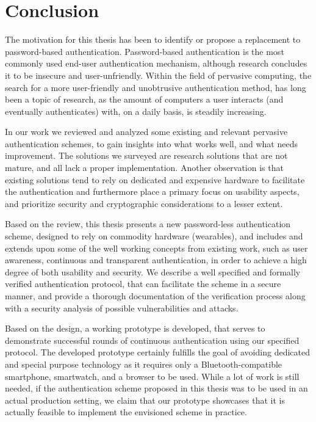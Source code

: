 \chapter{Conclusion}\label{ch:conclusion}

The motivation for this thesis has been to identify or propose a replacement to password-based authentication. Password-based authentication is the most commonly used end-user authentication mechanism, although research concludes it to be insecure and user-unfriendly.
Within the field of pervasive computing, the search for a more user-friendly and unobtrusive authentication method, has long been a topic of research, as the amount of computers a user interacts (and eventually authenticates) with, on a daily basis, is steadily increasing. 

In our work we reviewed and analyzed some existing and relevant pervasive authentication schemes, to gain insights into what works well, and what needs improvement. The solutions we surveyed \cite{stajano2011pico, ojala2008wearable, bardram2003context} are research solutions that are not mature, and all lack a proper implementation. Another observation is that existing solutions tend to rely on dedicated and expensive hardware to facilitate the authentication and furthermore place a primary focus on usability aspects, and prioritize security and cryptographic considerations to a lesser extent. 

Based on the review, this thesis presents a new password-less authentication scheme, designed to rely on commodity hardware (wearables), and includes and extends upon some of the well working concepts from existing work, such as user awareness, continuous and transparent authentication, in order to achieve a high degree of both usability and security. We describe a well specified and formally verified authentication protocol, that can facilitate the scheme in a secure manner, and provide a thorough documentation of the verification process along with a security analysis of possible vulnerabilities and attacks. 

Based on the design, a working prototype is developed, that serves to demonstrate successful rounds of continuous authentication using our specified protocol. The developed prototype certainly fulfills the goal of avoiding dedicated and special purpose technology as it requires only a Bluetooth-compatible smartphone, smartwatch, and a browser to be used. While a lot of work is still needed, if the authentication scheme proposed in this thesis was to be used in an actual production setting, we claim that our prototype showcases that it is actually feasible to implement the envisioned scheme in practice. 

